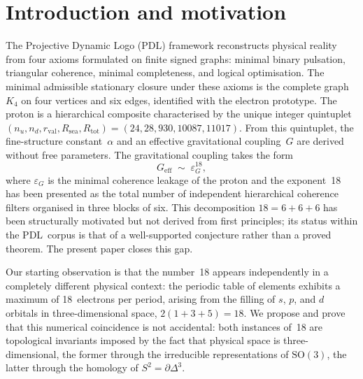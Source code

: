 \documentclass[11pt,a4paper]{article}
\theoremstyle{definition}
\newcommand{\PDL}{\textnormal{PDL}}
\newcommand{\Rsea}{R_{\mathrm{sea}}}
\newcommand{\Rtot}{R_{\mathrm{tot}}}
\newcommand{\rval}{r_{\mathrm{val}}}
\newcommand{\epsg}{\varepsilon_G}
\newcommand{\Kfour}{K_4}
\newcommand{\Sfour}{\partial\Delta^3}
\begin{document}
\begin{abstract}
dimensionality of physical space---though they do not determine each other numerically. All calculations are performed without free parameters over $\mathbb{Q}(\sqrt{5})$ using exact symbolic arithmetic.
\end{abstract}
\section{Introduction and motivation}
\label{sec:intro}
The Projective Dynamic Logo (\PDL) framework reconstructs physical reality from four axioms formulated on finite signed graphs: minimal binary pulsation, triangular coherence, minimal completeness, and logical optimisation.\cite{PDL_Main_2026,PDL_Intro_2026} The minimal admissible stationary closure under these axioms is the complete graph $\Kfour$ on four vertices and six edges, identified with the electron prototype.\cite{PDL_Main_2026} The proton is a hierarchical composite characterised by the unique integer quintuplet $(n_u, n_d, \rval, \Rsea, \Rtot) = (24, 28, 930, 10087, 11017)$.\cite{Combinatorial_Proton_v2_2026} From this quintuplet, the fine-structure constant~$\alpha$ and an effective gravitational coupling~$G$ are derived without free parameters.\cite{Alpha_PDL_v2_2026,Bridge_Formula_PDL_2026} The gravitational coupling takes the form
\begin{equation}
  \label{eq:G_eps18}
  G_{\mathrm{eff}} \;\sim\; \epsg^{18},
\end{equation}
where $\epsg$ is the minimal coherence leakage of the proton and the exponent~18 has been presented as the total number of independent hierarchical coherence filters organised in three blocks of six.\cite{Exponent_18_PDL_2026} This decomposition $18 = 6 + 6 + 6$ has been structurally motivated but not derived from first principles; its status within the \PDL\ corpus is that of a well-supported conjecture rather than a proved theorem.\cite{Exponent_18_PDL_2026,PDL_Global_Mapping_2026} The present paper closes this gap.

Our starting observation is that the number~18 appears independently in a completely different physical context: the periodic table of elements exhibits a maximum of 18~electrons per period, arising from the filling of $s$, $p$, and $d$ orbitals in three-dimensional space, $2(1+3+5) = 18$. We propose and prove that this numerical coincidence is not accidental: both instances of~18 are topological invariants imposed by the fact that physical space is three-dimensional, the former through the irreducible representations of $\mathrm{SO}(3)$, the latter through the homology of $S^2 = \Sfour$.
\end{document}
